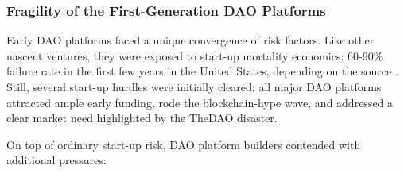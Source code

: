 \documentclass[10pt,lineno]{wlpeerj}
\begin{document}
\subsubsection*{Fragility of the First-Generation DAO Platforms}


Early DAO platforms faced a unique convergence of risk factors. Like other nascent ventures, they were exposed to start-up mortality economics: 60-90\% failure rate in the first few years in the United States, depending on the source  \citep{phillips1989formation,keogh2021survival}. Still, several start-up hurdles were initially cleared: all major DAO platforms attracted ample early funding, rode the blockchain-hype wave, and addressed a clear market need highlighted by the TheDAO disaster.

On top of ordinary start-up risk, DAO platform builders contended with additional pressures:
\end{document}
